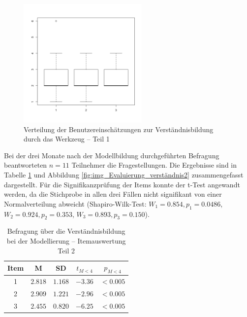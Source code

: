 \begin{figure}[htbp]
	\centering
		\includegraphics[height=2.5in]{img/Evaluierung/verstaendnis.png}
	\caption{Verteilung der Benutzereinschätzungen zur Verständnisbildung durch das Werkzeug -- Teil 1}
	\label{fig:img_Evaluierung_verständnis}
\end{figure}

Bei der drei Monate nach der Modellbildung durchgeführten Befragung beantworteten $n=11$ Teilnehmer die Fragestellungen. Die Ergebnisse sind in Tabelle \ref{tab:verständnis2} und Abbildung \ref{fig:img_Evaluierung_verständnis2} zusammengefasst dargestellt. Für die Signifikanzprüfung der Items konnte der t-Test angewandt werden, da die Stichprobe in allen drei Fällen nicht signifikant von einer Normalverteilung abweicht (Shapiro-Wilk-Test: $W_{1}=0.854, p_{1}=0.0486$, $W_{2}=0.924, p_{2}=0.353$, $W_{3}=0.893, p_{3}=0.150$).

\begin{table}[htbp]
	\centering
	\caption{Befragung über die Verständnisbildung bei der Modellierung -- Itemauswertung Teil 2}

\begin{tabular}{| c || c | c || c | c |}
  \hline
   Item & M & SD & $t_{M<4}$ & $p_{M<4}$ \\ \hline
   1  & $2.818$ & $1.168$ & $-3.36$ & $<0.005$ \\ 
   2  & $2.909$ & $1.221$ & $-2.96$ & $<0.005$ \\ 
   3  & $2.455$ & $0.820$ & $-6.25$ & $<0.005$ \\ \hline
\end{tabular} \\ 
	\label{tab:verständnis2}
\end{table}

